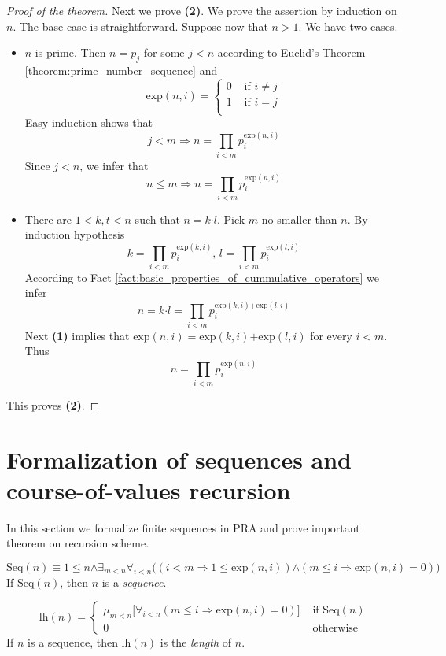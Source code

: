 \documentclass[10pt]{amsart}
\newcommand{\mforall}{\boldsymbol{\forall}}
\newcommand{\mexists}{\boldsymbol{\exists}}
\newcommand{\mra}{\boldsymbol{\Rightarrow}}
\newcommand{\mand}{\boldsymbol{\wedge}}
\newcommand{\mle}{\boldsymbol{<}}
\newcommand{\mge}{\boldsymbol{>}}
\newcommand{\mleq}{\boldsymbol{\leq}}
\newcommand{\meq}{\boldsymbol{=}}
\newcommand{\mneq}{\boldsymbol{\neq}}
\newcommand{\mplus}{\boldsymbol{+}}
\newcommand{\mdot}{\boldsymbol{\cdot}}
\begin{document}
\begin{proof}[Proof of the theorem]
	Next we prove \textbf{(2)}. We prove the assertion by induction on $n$. The base case is straightforward. Suppose now that $n \mge 1$. We have two cases.
	\begin{itemize}
		\item $n$ is prime. Then $n \meq p_j$ for some $j \mle n$ according to Euclid's Theorem \ref{theorem:prime_number_sequence} and
		      $$\mathrm{exp}(n,i) \meq \begin{cases}
				      0 & \mbox{ if }i \mneq j \\
				      1 & \mbox{ if }i \meq j    \\
			      \end{cases}
		      $$
		      Easy induction shows that
		      $$j \mle m \mra n \meq \prod_{i \mle m}p_i^{\mathrm{exp}(n,i)}$$
		      Since $j \mle n$, we infer that
		      $$n \mleq m \mra n \meq \prod_{i \mle m}p_i^{\mathrm{exp}(n,i)}$$
		\item There are $1 \mle k,t \mle n$ such that $n \meq k\mdot l$. Pick $m$ no smaller than $n$. By induction hypothesis
		      $$k \meq \prod_{i \mle m}p_i^{\mathrm{exp}(k,i)},\,l \meq \prod_{i \mle m}p_i^{\mathrm{exp}(l,i)}$$
		      According to Fact \ref{fact:basic_properties_of_cummulative_operators} we infer
		      $$n \meq k\mdot l \meq \prod_{i \mle m}p_i^{\mathrm{exp}(k,i) \mplus \mathrm{exp}(l,i)}$$
		      Next \textbf{(1)} implies that $\mathrm{exp}(n,i) \meq \mathrm{exp}(k,i) \mplus \mathrm{exp}(l,i)$ for every $i \mle m$. Thus
		      $$n \meq \prod_{i \mle m}p_i^{\mathrm{exp}(n,i)}$$
	\end{itemize}
	This proves \textbf{(2)}.
\end{proof}

\section{Formalization of sequences and course-of-values recursion}
\noindent
In this section we formalize finite sequences in $\mathrm{PRA}$ and prove important theorem on recursion scheme.

\begin{definition}
	$$\mathrm{Seq}(n) \equiv 1 \mleq n \mand \mexists_{m \mle n}\mforall_{i \mle n}\big(\left(i \mle m \mra 1 \mleq \mathrm{exp}(n,i)\right) \mand \left(m \mleq i \mra \mathrm{exp}(n,i) \meq 0\right)\big)$$
	If $\mathrm{Seq}(n)$, then $n$ is a \textit{sequence}.
\end{definition}

\begin{definition}
	$$\mathrm{lh}(n) \meq \begin{cases}
			\mu_{m \mle n}\big[\mforall_{i \mle n}\left(m \mleq i \mra \mathrm{exp}(n,i) \meq 0\right)\big] & \mbox{ if }\mathrm{Seq}(n) \\
			0                                                                                   & \mbox{ otherwise }
		\end{cases}
	$$
	If $n$ is a sequence, then $\mathrm{lh}(n)$ is the \textit{length} of $n$.
\end{definition}
\end{document}
